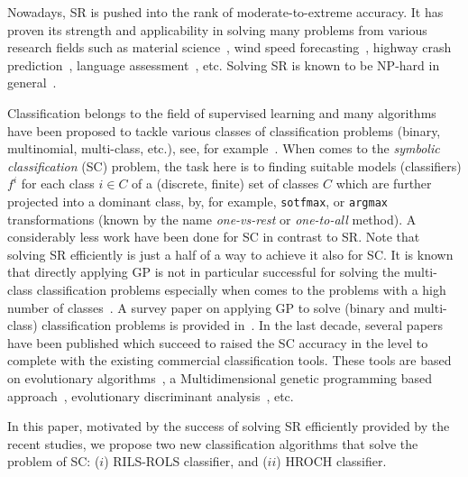 \documentclass{bmcart}
\begin{document}
Nowadays, SR is pushed into the rank of moderate-to-extreme accuracy.  It has proven its strength and applicability in solving many problems from various research fields such as material science~\cite{wang2019symbolic}, wind speed forecasting~\cite{abdellaoui2021symbolic},  highway crash prediction~\cite{veran2023interpretable}, language assessment~\cite{aryadoust2015application}, etc.  Solving SR is known to be NP-hard in general~\cite{virgolin2022symbolic}. 


Classification belongs to the field of supervised learning and many algorithms have been proposed to tackle various classes of classification problems (binary, multinomial, multi-class, etc.), see, for example~\cite{cunningham2008supervised, caruana2006empirical}. When comes to the \emph{symbolic classification} (SC) problem, the task here is to finding suitable models (classifiers)  $f^i$ for each class $i \in C$ of a (discrete, finite) set of classes $C$ which are further projected into a dominant  class, by, for example, \texttt{sotfmax}, or \texttt{argmax} transformations (known by the name \emph{one-vs-rest} or \emph{one-to-all}  method). A considerably less work have been done for SC in contrast to SR. Note that solving SR efficiently is just a half of a way to achieve it also for SC. It is known that directly applying GP is not in particular successful for solving the multi-class classification problems especially when comes to the problems with a high number of classes~\cite{korns2018evolutionary}. A survey paper on applying GP to solve (binary and multi-class) classification problems is provided in~\cite{espejo2009survey}.  In the last decade, several papers have been published which succeed to raised the SC accuracy in the level to complete with the existing commercial classification tools. These tools are based on evolutionary algorithms~\cite{korns2018evolutionary}, a Multidimensional genetic programming based approach~\cite{munoz2015m3gp,la2019multidimensional},  evolutionary discriminant analysis~\cite{korns2017evolutionary}, etc. 

In this paper, motivated by the success of solving SR efficiently provided by the recent studies, we propose two new classification algorithms that solve the problem of SC: ($i$) RILS-ROLS classifier, and ($ii$) HROCH classifier. 


\end{document}
